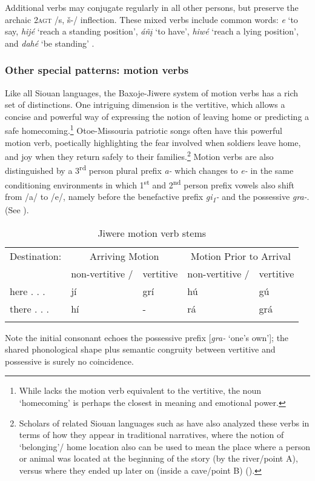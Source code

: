 \documentclass[output=paper]{LSP/langsci}
\begin{document}
Additional verbs may conjugate regularly in all other persons, but preserve the archaic \textsc{2agt} /s, \v{s}-/ inflection.  These mixed verbs include common words: \textit{e} `to say, \textit{hijé} `reach a standing position', \textit{áñ\k{i}} `to have', \textit{hiwé} `reach  a lying position', and \textit{dahé} `be standing' \citep[243]{Whitman1947}.

\subsubsection{Other special  patterns:  motion verbs} 	               		                   
Like all Siouan languages, the Baxoje-Jiwere system of motion verbs has a rich set of distinctions. One intriguing dimension is the vertitive, which allows a concise and powerful way of expressing the notion of leaving home or predicting a safe homecoming.\footnote{While  lacks the motion verb equivalent to the vertitive, the  noun `homecoming' is perhaps the closest in meaning and emotional power.}  Otoe-Missouria patriotic songs often have this powerful motion verb, poetically highlighting the fear involved when soldiers leave home, and joy when they return safely to their families.\footnote{Scholars of related Siouan languages such as  have also analyzed these verbs in terms of how they appear in traditional narratives, where the notion of `belonging'/ home location also can be used to mean the place where a person or animal was located at the beginning of the story (by the river/point A), versus where they ended up later on (inside a cave/point B) (\citealt{Cumberland2005}).} Motion verbs are also distinguished by a 3\textsuperscript{rd} person plural prefix \textit{a-} which changes to \textit{e-} in the same conditioning environments in which 1\textsuperscript{st} and 2\textsuperscript{nd} person prefix vowels also shift from /a/ to /e/, namely before the benefactive prefix \textit{gi\textsubscript{1}-} and the possessive \textit{gra-}. (See ).

\begin{table} 
\begin{tabular}{ l l l l l }
\lsptoprule
 Destination: & \multicolumn{2}{c}{Arriving Motion} & \multicolumn{2}{c}{Motion Prior to Arrival} \\
& non-vertitive / & vertitive & non-vertitive / & vertitive \\
\midrule
here . . . 	& j\'i  & gr\'i & hú &  gú \\
there . . . 	& h\'i &   -  & rá & grá \\
\lspbottomrule
\end{tabular}
\caption{Jiwere motion verb stems \citep[293]{Taylor1976a}} \label{motionverb}
\end{table}
Note the initial consonant  echoes the possessive prefix [\textit{gra-} `one's own']; the shared phonological shape plus semantic congruity between vertitive and possessive is surely no coincidence.  
\end{document}
